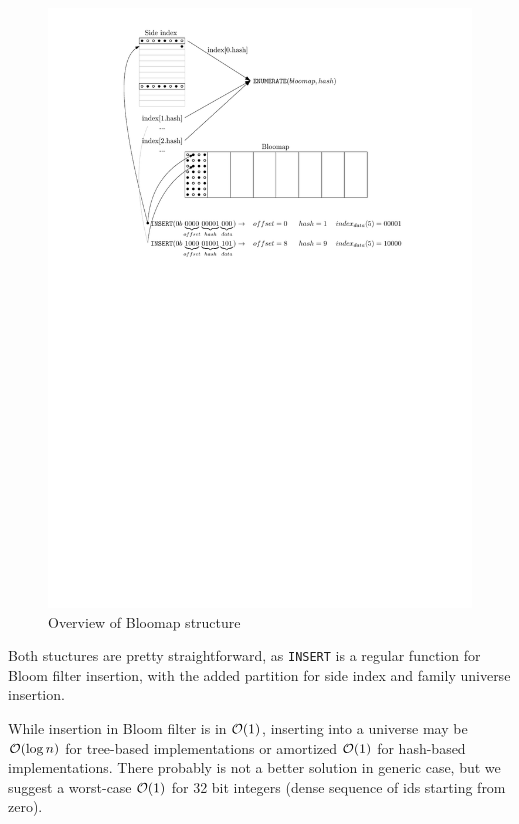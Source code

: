 \begin{figure}[!ht]
\centering
	\includegraphics{./img/bloomap_overview.pdf}
	\caption{Overview of Bloomap structure}
	\label{figure-bloomap-overview}
\end{figure}



Both stuctures are pretty straightforward, as {\tt INSERT} is a regular function
for Bloom filter insertion, with the added partition for side index and family
universe insertion.

While insertion in Bloom filter is in $\mathcal{O}(1)$, inserting into a universe may be
$\mathcal{O}(\log n)$ for tree-based implementations or amortized $\mathcal{O}(1)$ for hash-based
implementations. There probably is not a better solution in generic case,
but we suggest a worst-case $\mathcal{O}(1)$ for 32 bit integers (dense sequence of
ids starting from zero).

